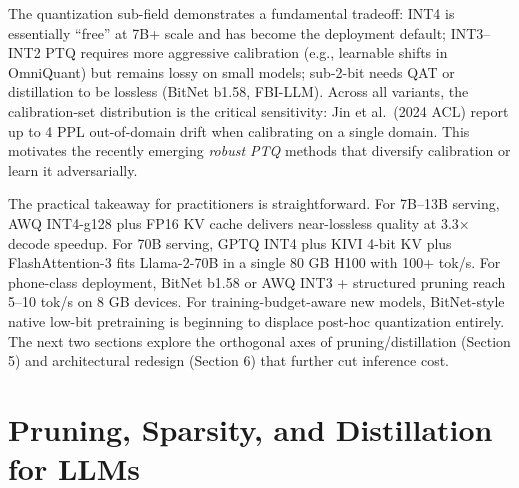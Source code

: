 The quantization sub-field demonstrates a fundamental tradeoff: INT4 is essentially ``free'' at 7B+ scale and has become the deployment default; INT3--INT2 PTQ requires more aggressive calibration (e.g., learnable shifts in OmniQuant) but remains lossy on small models; sub-2-bit needs QAT or distillation to be lossless (BitNet b1.58, FBI-LLM). Across all variants, the calibration-set distribution is the critical sensitivity: Jin et al.~(2024 ACL) report up to 4 PPL out-of-domain drift when calibrating on a single domain. This motivates the recently emerging \emph{robust PTQ} methods that diversify calibration or learn it adversarially.

The practical takeaway for practitioners is straightforward. For 7B--13B serving, AWQ INT4-g128 plus FP16 KV cache delivers near-lossless quality at 3.3× decode speedup. For 70B serving, GPTQ INT4 plus KIVI 4-bit KV plus FlashAttention-3 fits Llama-2-70B in a single 80 GB H100 with 100+ tok/s. For phone-class deployment, BitNet b1.58 or AWQ INT3 + structured pruning reach 5--10 tok/s on 8 GB devices. For training-budget-aware new models, BitNet-style native low-bit pretraining is beginning to displace post-hoc quantization entirely. The next two sections explore the orthogonal axes of pruning/distillation (Section 5) and architectural redesign (Section 6) that further cut inference cost.

\section{Pruning, Sparsity, and Distillation for LLMs}\label{pruning-sparsity-and-distillation-for-llms}

